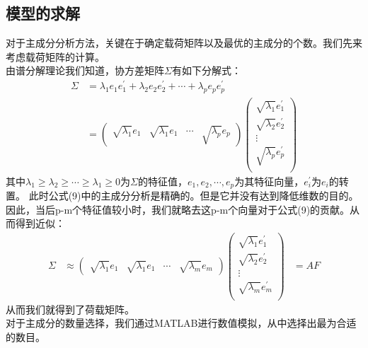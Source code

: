\documentclass[a4paper]{article}
\begin{document}
\subsection{模型的求解}
对于主成分分析方法，关键在于确定载荷矩阵以及最优的主成分的个数。我们先来考虑载荷矩阵的计算。\\
由谱分解理论我们知道，协方差矩阵$\Sigma$有如下分解式：
\begin{equation}
\begin{aligned}
\Sigma &=\lambda_{1} e_{1} e_{1}^{\prime}+\lambda_{2} e_{2} e_{2}^{\prime}+\cdots+\lambda_{p} e_{p} e_{p}^{\prime}  \\
       &=\left(  
      \begin{array}{cccc}  
          \sqrt{\lambda_1}e_1 & \sqrt{\lambda_1}e_1&\cdots&\sqrt{\lambda_p}e_p
  \end{array}  
  \right)  
  \left(  
  \begin{array}{c}  
           \sqrt{\lambda_1}e_1^{\prime} \\  
          \sqrt{\lambda_2}e_2^{\prime}\\  
         \vdots                      \\
         \sqrt{\lambda_p}e_p^{\prime} \\
 \end{array}  
 \right)  
\end{aligned}
\end{equation}
其中$\lambda_1 \geq \lambda_2 \geq \cdots \geq \lambda_1 \geq 0$为$\Sigma$的特征值，$e_1,e_2,\cdots,e_p$为其特征向量，$e_i^{\prime}$为$e_i$的转置。
此时公式(9)中的主成分分析是精确的。但是它并没有达到降低维数的目的。因此，当后p-m个特征值较小时，我们就略去这p-m个向量对于公式(9)的贡献。从而得到近似：
\begin{equation}
\begin{aligned}
\Sigma & \approx \left(  
      \begin{array}{cccc}  
          \sqrt{\lambda_1}e_1 & \sqrt{\lambda_1}e_1&\cdots&\sqrt{\lambda_m}e_m
  \end{array}  
  \right)  
  \left(  
  \begin{array}{c}  
           \sqrt{\lambda_1}e_1^{\prime} \\  
          \sqrt{\lambda_2}e_2^{\prime}\\  
         \vdots                      \\
         \sqrt{\lambda_m}e_m^{\prime} \\
 \end{array}  
 \right)  
   & =AF
 \end{aligned}
\end{equation}
从而我们就得到了荷载矩阵。\\
\indent 对于主成分的数量选择，我们通过MATLAB进行数值模拟，从中选择出最为合适的数目。
\end{document}

